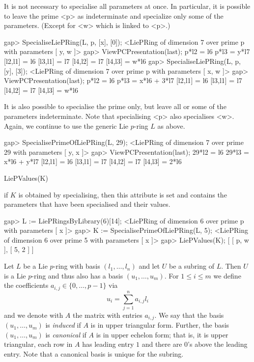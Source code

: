 It is not necessary to specialise all parameters at once. In particular,
it is possible to leave the prime <p> as indeterminate and specialize only
some of the parameters. (Except for <w> which is linked to <p>.)

\beginexample
gap> SpecialiseLiePRing(L, p, [x], [0]);
<LiePRing of dimension 7 over prime p with parameters [ y, w ]>
gap> ViewPCPresentation(last);
p*l2 = l6
p*l3 = y*l7
[l2,l1] = l6
[l3,l1] = l7
[l4,l2] = l7
[l4,l3] = w*l6
gap> SpecialiseLiePRing(L, p, [y], [3]);
<LiePRing of dimension 7 over prime p with parameters [ x, w ]>
gap> ViewPCPresentation(last);
p*l2 = l6
p*l3 = x*l6 + 3*l7
[l2,l1] = l6
[l3,l1] = l7
[l4,l2] = l7
[l4,l3] = w*l6
\endexample

It is also possible to specialise the prime only, but leave all or
some of the parameters indeterminate. Note that specialising <p>
also specialises <w>. Again, we continue to use the generic Lie 
$p$-ring $L$ as above.

\beginexample
gap> SpecialisePrimeOfLiePRing(L, 29);
<LiePRing of dimension 7 over prime 29 with parameters [ y, x ]>
gap> ViewPCPresentation(last);
29*l2 = l6
29*l3 = x*l6 + y*l7
[l2,l1] = l6
[l3,l1] = l7
[l4,l2] = l7
[l4,l3] = 2*l6
\endexample

\> LiePValues(K)

if $K$ is obtained by specialising, then this attribute is set and 
contains the parameters that have been specialised and their values.

\beginexample
gap>  L := LiePRingsByLibrary(6)[14];
<LiePRing of dimension 6 over prime p with parameters [ x ]>
gap>  K := SpecialisePrimeOfLiePRing(L, 5);
<LiePRing of dimension 6 over prime 5 with parameters [ x ]>
gap> LiePValues(K);
[ [ p, w ], [ 5, 2 ] ]
\endexample


Let $L$ be a Lie $p$-ring with basis $(l_1, \ldots, l_n)$ and let $U$ be a 
subring of $L$. Then $U$ is a Lie $p$-ring and thus also has a basis $(u_1, 
\ldots, u_m)$. For $1 \leq i \leq m$ we define the coefficients $a_{i,j} 
\in \{0, \ldots, p-1\}$ via 
$$ u_i = \sum_{j=1}^n a_{i,j} l_i $$
and we denote with $A$ the matrix with entries $a_{i,j}$. We say that the 
basis $(u_1, \ldots, u_m)$ is {\it induced} if $A$ is in upper triangular 
form. Further, the basis $(u_1, \ldots, u_m)$ is {\it canonical} if $A$ is 
in upper echelon form; that is, it is upper triangular, each row in $A$ has 
leading entry $1$ and there are $0$'s above the leading entry. Note that a
canonical basis is unique for the subring.

